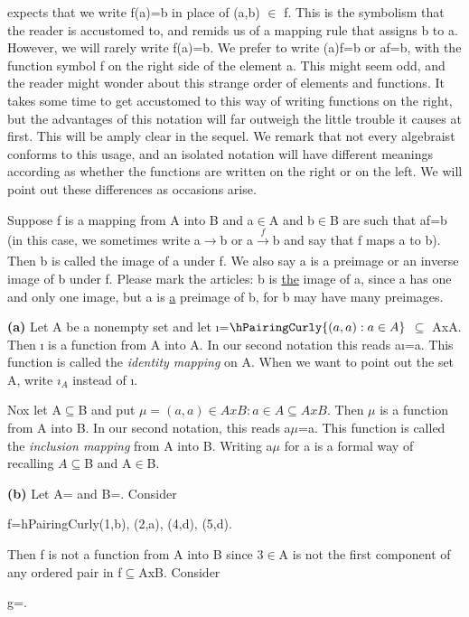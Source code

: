 \documentclass[11pts]{amsbook}
\begin{document}
expects that we write f(a)=b in place of (a,b) $\in$ f. This is the symbolism that the reader is accustomed to, and remids us of a mapping rule that assigns b to a. However, we will rarely write f(a)=b. We prefer to write
(a)f=b or af=b, with the function symbol f on the right side of the element a. This might seem odd, and the reader might wonder about this strange order of elements and functions. It takes some time to get accustomed to this way of writing functions on the right, but the advantages of this notation will far outweigh the little trouble it causes at first. This will be amply clear in the sequel. We remark that not every algebraist conforms to this usage, and an isolated notation will have different meanings according as whether the functions are written on the right or on the left. We will point out these differences as occasions arise.

Suppose f is a mapping from A into B and a$\in$A and b$\in$B are such that af=b (in this case, we sometimes write a$\to$b or a$\xrightarrow[]{f}$b and say that f maps a to b). Then b is called the image of a under f. We also say a is a preimage or an inverse image of b under f. Please mark the articles: b is \underline{the} image of a, since a has one and only one image, but a is \underline{a} preimage of b, for b may have many preimages.
\begin{exmp}
\textbf{(a)} Let A be a nonempty set and let ı=$\hPairingCurly{(a,a): a\in A}$ $\subseteq$ AxA. Then ı is a function from A into A. In our second notation this reads aı=a. This function is called the \textit{identity mapping} on A. When we want to point out the set A, write $ı_A$ instead of ı. 

Nox let A$\subseteq$B and put $\mu ={(a,a)\in AxB: a\in A}\subseteq AxB.$ Then $\mu$ is a function from A into B. In our second notation, this reads a$\mu$=a. This function is called the \textit{inclusion mapping} from A into B. Writing a$\mu$ for a is a formal way of recalling $A\subseteq$B and A$\in$B.

\textbf{(b)} Let A= and B=. Consider
\begin{center}
f=hPairingCurly{(1,b), (2,a), (4,d), (5,d)}.
\end{center}
Then f is not a function from A into B since 3$\in$A is not the first component of any ordered pair in f$\subseteq$AxB. Consider
\begin{center}
g=.
\end{center}
\end{exmp}
\end{document}
